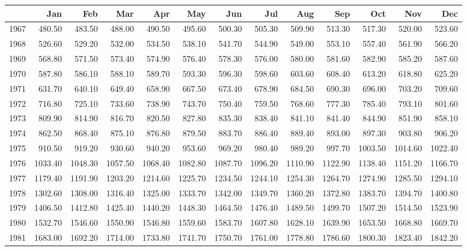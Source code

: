 \begin{longtable}{rrrrrrrrrrrrr}
  \hline
 & Jan & Feb & Mar & Apr & May & Jun & Jul & Aug & Sep & Oct & Nov & Dec \\ 
  \hline
1967 & 480.50 & 483.50 & 488.00 & 490.50 & 495.60 & 500.30 & 505.30 & 509.90 & 513.30 & 517.30 & 520.00 & 523.60 \\ 
  1968 & 526.60 & 529.20 & 532.00 & 534.50 & 538.10 & 541.70 & 544.90 & 549.00 & 553.10 & 557.40 & 561.90 & 566.20 \\ 
  1969 & 568.80 & 571.50 & 573.40 & 574.90 & 576.40 & 578.30 & 576.00 & 580.00 & 581.60 & 582.90 & 585.20 & 587.60 \\ 
  1970 & 587.80 & 586.10 & 588.10 & 589.70 & 593.30 & 596.30 & 598.60 & 603.60 & 608.40 & 613.20 & 618.80 & 625.20 \\ 
  1971 & 631.70 & 640.10 & 649.40 & 658.90 & 667.50 & 673.40 & 678.90 & 684.50 & 690.30 & 696.00 & 703.20 & 709.60 \\ 
  1972 & 716.80 & 725.10 & 733.60 & 738.90 & 743.70 & 750.40 & 759.50 & 768.60 & 777.30 & 785.40 & 793.10 & 801.60 \\ 
  1973 & 809.90 & 814.90 & 816.70 & 820.50 & 827.80 & 835.30 & 838.40 & 841.10 & 841.40 & 844.90 & 851.90 & 858.10 \\ 
  1974 & 862.50 & 868.40 & 875.10 & 876.80 & 879.50 & 883.70 & 886.40 & 889.40 & 893.00 & 897.30 & 903.80 & 906.20 \\ 
  1975 & 910.50 & 919.20 & 930.60 & 940.20 & 953.60 & 969.20 & 980.40 & 989.20 & 997.70 & 1003.50 & 1014.60 & 1022.40 \\ 
  1976 & 1033.40 & 1048.30 & 1057.50 & 1068.40 & 1082.80 & 1087.70 & 1096.20 & 1110.90 & 1122.90 & 1138.40 & 1151.20 & 1166.70 \\ 
  1977 & 1179.40 & 1191.90 & 1203.20 & 1214.60 & 1225.70 & 1234.50 & 1244.10 & 1254.30 & 1264.70 & 1274.90 & 1285.50 & 1294.10 \\ 
  1978 & 1302.60 & 1308.00 & 1316.40 & 1325.00 & 1333.70 & 1342.00 & 1349.70 & 1360.20 & 1372.80 & 1383.70 & 1394.70 & 1400.80 \\ 
  1979 & 1406.50 & 1412.80 & 1425.40 & 1440.20 & 1448.30 & 1464.50 & 1476.40 & 1489.50 & 1499.70 & 1507.20 & 1514.50 & 1523.90 \\ 
  1980 & 1532.70 & 1546.60 & 1550.90 & 1546.80 & 1559.60 & 1583.70 & 1607.80 & 1628.10 & 1639.90 & 1653.50 & 1668.80 & 1669.70 \\ 
  1981 & 1683.00 & 1692.20 & 1714.00 & 1733.80 & 1741.70 & 1750.70 & 1761.00 & 1778.80 & 1786.60 & 1800.30 & 1823.40 & 1842.20 \\ 

\end{longtable}
